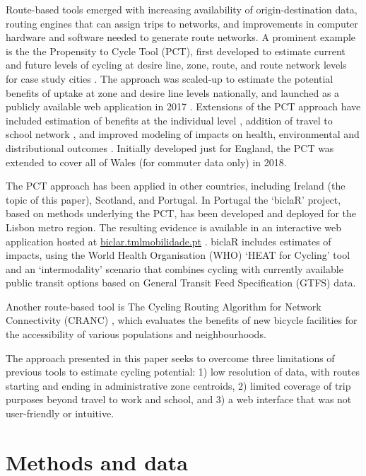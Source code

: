 \documentclass[
  super,
  preprint,
  3p]{elsarticle}
\begin{document}
Route-based tools emerged with increasing availability of
origin-destination data, routing engines that can assign trips to
networks, and improvements in computer hardware and software needed to
generate route networks. A prominent example is the the Propensity to
Cycle Tool (PCT), first developed to estimate current and future levels
of cycling at desire line, zone, route, and route network levels for
case study cities \citep{lovelace2016}. The approach was scaled-up to
estimate the potential benefits of uptake at zone and desire line levels
nationally, and launched as a publicly available web application in 2017
\citep{lovelace2017}. Extensions of the PCT approach have included
estimation of benefits at the individual level \citep{woodcock2018},
addition of travel to school network \citep{goodman2019}, and improved
modeling of impacts on health, environmental and distributional outcomes
\citep{woodcock2021}. Initially developed just for England, the PCT was
extended to cover all of Wales (for commuter data only) in 2018.

The PCT approach has been applied in other countries, including Ireland
(the topic of this paper), Scotland, and Portugal. In Portugal the
`biclaR' project, based on methods underlying the PCT, has been
developed and deployed for the Lisbon metro region. The resulting
evidence is available in an interactive web application hosted at
\href{https://biclar.tmlmobilidade.pt}{biclar.tmlmobilidade.pt}
\citep{felix2023}. biclaR includes estimates of impacts, using the World
Health Organisation (WHO) `HEAT for Cycling' tool and an `intermodality'
scenario that combines cycling with currently available public transit
options based on General Transit Feed Specification (GTFS) data.

{Another route-based tool is The Cycling Routing Algorithm for Network
Connectivity (CRANC) \citep{gehrke_cycling-focused_2020}, which
evaluates the benefits of new bicycle facilities for the accessibility
of various populations and neighbourhoods.}

The approach presented in this paper seeks to overcome three limitations
of previous tools to estimate cycling potential: 1) low resolution of
data, with routes starting and ending in administrative zone centroids,
2) limited coverage of trip purposes beyond travel to work and school,
and 3) a web interface that was not user-friendly or intuitive.

\section{Methods and data}\label{sec-methods}
\end{document}

